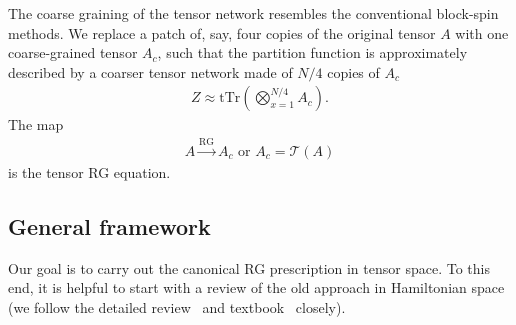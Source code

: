 \documentclass[aps,prr,reprint,superscriptaddress,floatfix]{revtex4-2}
\newcommand{\tTr}{\mathrm{tTr}}
\begin{document}
The coarse graining of the tensor network resembles the conventional block-spin methods.
We replace a patch of, say, four copies of the original tensor $A$ with one coarse-grained tensor $A_c$, such that the partition function is approximately described by a coarser tensor network made of $N/4$ copies of $A_c$
%
\begin{align}\label{eq:ZafterRG}
    Z \approx \tTr\left(\bigotimes_{x=1}^{N/4}A_c\right).
\end{align}
%
The map 
%
\begin{align}\label{def:tensorRGeq}
    A \xrightarrow{\text{RG}} A_c \text{ or } A_c = \mathcal{T}(A) 
\end{align}
is the tensor RG equation.
%

\subsection{General framework\label{RGprescrip}}
Our goal is to carry out the canonical RG prescription in tensor space.
To this end, it is helpful to start with a review of the old approach in Hamiltonian space (we follow the detailed review~\cite{kadanoff2014} and textbook~\cite{cardy_1996} closely).
%
\end{document}
